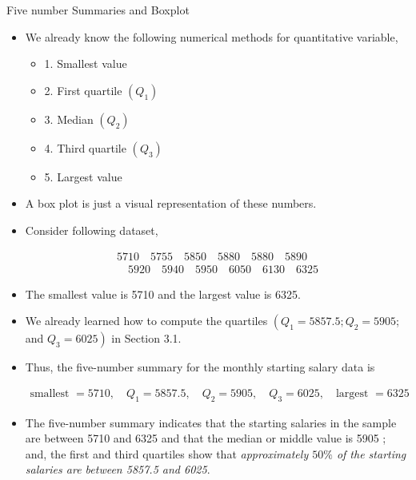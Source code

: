 \documentclass[8pt, usepdftitle=false]{beamer}
\begin{document}
\begin{frame}[allowframebreaks]{Five number Summaries and Boxplot}

\begin{itemize}
  \item We already know the following numerical methods for quantitative variable,

    \begin{itemize}
      \item 1. Smallest value
      \item 2. First quartile $\left(Q_1\right)$
      \item 3. Median $\left(Q_2\right)$
      \item 4. Third quartile $\left(Q_3\right)$
      \item 5. Largest value
    \end{itemize}

    \item A box plot is just a visual representation of these numbers.

    \item Consider following dataset,

    \begin{align*}
      5710 \quad  5755 \quad  5850 \quad  5880 \quad  5880 \quad  5890 \\
       \quad  5920 \quad  5940 \quad  5950 \quad  6050 \quad  6130 \quad  6325
    \end{align*}

  \item The smallest value is 5710 and the largest value is 6325.

  \item We already learned  how to compute the quartiles $\left(Q_1=5857.5 ; Q_2=5905\right.$; and $\left.Q_3=6025\right)$ in Section 3.1. 

  \item Thus, the five-number summary for the monthly starting salary data is

  \begin{align*}
      \text{smallest }= 5710,\quad  Q_1 = 5857.5,\quad  Q_2 = 5905,\quad  Q_3 = 6025,\quad  \text{largest } =6325
  \end{align*}


  \item The five-number summary indicates that the starting salaries in the sample are between 5710 and 6325 and that the median or middle value is 5905 ; and, the first and third quartiles show that \emph{approximately $50 \%$ of the starting salaries are between 5857.5 and 6025}.


\end{itemize}
\end{frame}
\end{document}
